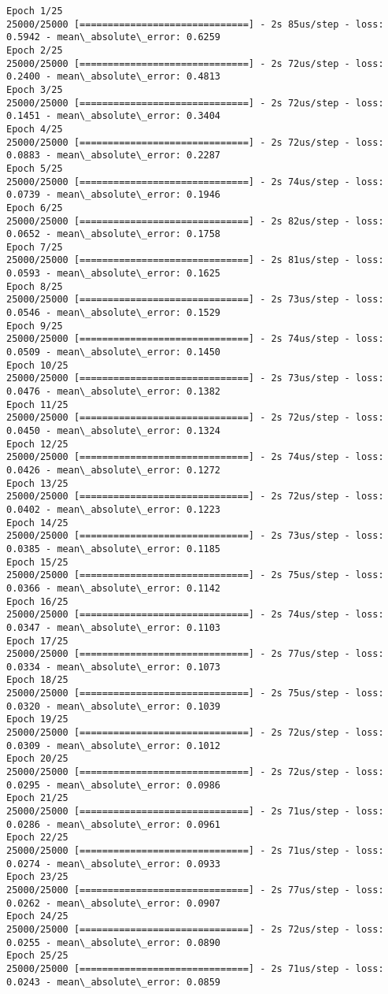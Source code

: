 \documentclass[11pt]{article}
\begin{document}
    \begin{Verbatim}[commandchars=\\\{\}]
Epoch 1/25
25000/25000 [==============================] - 2s 85us/step - loss: 0.5942 - mean\_absolute\_error: 0.6259
Epoch 2/25
25000/25000 [==============================] - 2s 72us/step - loss: 0.2400 - mean\_absolute\_error: 0.4813
Epoch 3/25
25000/25000 [==============================] - 2s 72us/step - loss: 0.1451 - mean\_absolute\_error: 0.3404
Epoch 4/25
25000/25000 [==============================] - 2s 72us/step - loss: 0.0883 - mean\_absolute\_error: 0.2287
Epoch 5/25
25000/25000 [==============================] - 2s 74us/step - loss: 0.0739 - mean\_absolute\_error: 0.1946
Epoch 6/25
25000/25000 [==============================] - 2s 82us/step - loss: 0.0652 - mean\_absolute\_error: 0.1758
Epoch 7/25
25000/25000 [==============================] - 2s 81us/step - loss: 0.0593 - mean\_absolute\_error: 0.1625
Epoch 8/25
25000/25000 [==============================] - 2s 73us/step - loss: 0.0546 - mean\_absolute\_error: 0.1529
Epoch 9/25
25000/25000 [==============================] - 2s 74us/step - loss: 0.0509 - mean\_absolute\_error: 0.1450
Epoch 10/25
25000/25000 [==============================] - 2s 73us/step - loss: 0.0476 - mean\_absolute\_error: 0.1382
Epoch 11/25
25000/25000 [==============================] - 2s 72us/step - loss: 0.0450 - mean\_absolute\_error: 0.1324
Epoch 12/25
25000/25000 [==============================] - 2s 74us/step - loss: 0.0426 - mean\_absolute\_error: 0.1272
Epoch 13/25
25000/25000 [==============================] - 2s 72us/step - loss: 0.0402 - mean\_absolute\_error: 0.1223
Epoch 14/25
25000/25000 [==============================] - 2s 73us/step - loss: 0.0385 - mean\_absolute\_error: 0.1185
Epoch 15/25
25000/25000 [==============================] - 2s 75us/step - loss: 0.0366 - mean\_absolute\_error: 0.1142
Epoch 16/25
25000/25000 [==============================] - 2s 74us/step - loss: 0.0347 - mean\_absolute\_error: 0.1103
Epoch 17/25
25000/25000 [==============================] - 2s 77us/step - loss: 0.0334 - mean\_absolute\_error: 0.1073
Epoch 18/25
25000/25000 [==============================] - 2s 75us/step - loss: 0.0320 - mean\_absolute\_error: 0.1039
Epoch 19/25
25000/25000 [==============================] - 2s 72us/step - loss: 0.0309 - mean\_absolute\_error: 0.1012
Epoch 20/25
25000/25000 [==============================] - 2s 72us/step - loss: 0.0295 - mean\_absolute\_error: 0.0986
Epoch 21/25
25000/25000 [==============================] - 2s 71us/step - loss: 0.0286 - mean\_absolute\_error: 0.0961
Epoch 22/25
25000/25000 [==============================] - 2s 71us/step - loss: 0.0274 - mean\_absolute\_error: 0.0933
Epoch 23/25
25000/25000 [==============================] - 2s 77us/step - loss: 0.0262 - mean\_absolute\_error: 0.0907
Epoch 24/25
25000/25000 [==============================] - 2s 72us/step - loss: 0.0255 - mean\_absolute\_error: 0.0890
Epoch 25/25
25000/25000 [==============================] - 2s 71us/step - loss: 0.0243 - mean\_absolute\_error: 0.0859

    \end{Verbatim}
\end{document}
